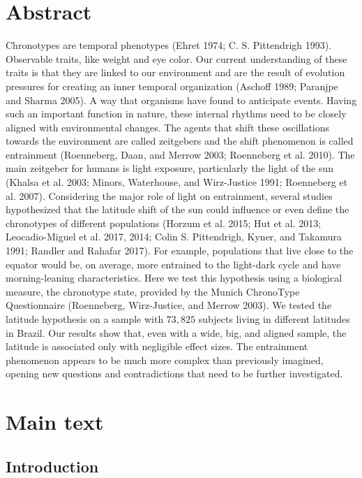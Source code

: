 \documentclass[
  12pt,
  a4paper,
  oneside]{tesesusp}
\begin{document}
\hypertarget{abstract-1}{%
\section{Abstract}\label{abstract-1}}

Chronotypes are temporal phenotypes (Ehret 1974; C. S. Pittendrigh
1993). Observable traits, like weight and eye color. Our current
understanding of these traits is that they are linked to our environment
and are the result of evolution pressures for creating an inner temporal
organization (Aschoff 1989; Paranjpe and Sharma 2005). A way that
organisms have found to anticipate events. Having such an important
function in nature, these internal rhythms need to be closely aligned
with environmental changes. The agents that shift these oscillations
towards the environment are called zeitgebers and the shift phenomenon
is called entrainment (Roenneberg, Daan, and Merrow 2003; Roenneberg et
al. 2010). The main zeitgeber for humans is light exposure, particularly
the light of the sun (Khalsa et al. 2003; Minors, Waterhouse, and
Wirz-Justice 1991; Roenneberg et al. 2007). Considering the major role
of light on entrainment, several studies hypothesized that the latitude
shift of the sun could influence or even define the chronotypes of
different populations (Horzum et al. 2015; Hut et al. 2013;
Leocadio-Miguel et al. 2017, 2014; Colin S. Pittendrigh, Kyner, and
Takamura 1991; Randler and Rahafar 2017). For example, populations that
live close to the equator would be, on average, more entrained to the
light-dark cycle and have morning-leaning characteristics. Here we test
this hypothesis using a biological measure, the chronotype state,
provided by the Munich ChronoType Questionnaire (Roenneberg,
Wirz-Justice, and Merrow 2003). We tested the latitude hypothesis on a
sample with \(73,825\) subjects living in different latitudes in Brazil.
Our results show that, even with a wide, big, and aligned sample, the
latitude is associated only with negligible effect sizes. The
entrainment phenomenon appears to be much more complex than previously
imagined, opening new questions and contradictions that need to be
further investigated.

\hypertarget{main-text}{%
\section{Main text}\label{main-text}}

\hypertarget{introduction-1}{%
\subsection{Introduction}\label{introduction-1}}
\end{document}

